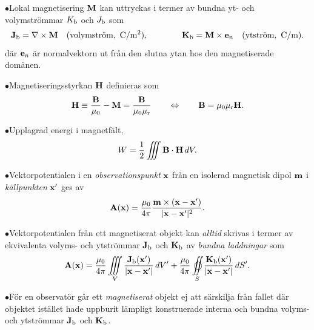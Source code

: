 \item{$\bullet$}{Lokal magnetisering ${\bf M}$ kan uttryckas i termer av
  bundna yt- och volymstr{\"o}mmar $K_{\rm b}$ och $J_{\rm b}$ som
  $$
    {\bf J}_{\rm b}=\nabla\times{\bf M}
                   \quad(\hbox{volymstr{\"o}m},\ {\rm C}/{\rm m}^2),\qquad\qquad
    {\bf K}_{\rm b}={\bf M}\times{\bf e}_n
                   \quad(\hbox{ytstr{\"o}m},\ {\rm C}/{\rm m}).
  $$
  d{\"a}r ${\bf e}_n$ {\"a}r normalvektorn ut fr{\aa}n den slutna ytan hos den
  magnetiserade dom{\"a}nen.}
\item{$\bullet$}{Magnetiseringsstyrkan ${\bf H}$ definieras som
  $$
    {\bf H}\equiv{{\bf B}\over{\mu_0}}-{\bf M}={{\bf B}\over{\mu_0\mu_{\rm r}}}
    \qquad\Leftrightarrow\qquad
    {\bf B}=\mu_0\mu_{\rm r}{\bf H}.
  $$}
\item{$\bullet$}{Upplagrad energi i magnetf{\"a}lt,
  $$
    W = {{1}\over{2}}\iiint{\bf B}\cdot{\bf H}\,dV.
  $$}
\item{$\bullet$}{Vektorpotentialen i en {\it observationspunkt} ${\bf x}$
  fr{\aa}n en isolerad magnetisk dipol ${\bf m}$ i {\it k{\"a}llpunkten}
  ${\bf x}'$ ges av
  $$
    {\bf A}({\bf x})={{\mu_0}\over{4\pi}}
      {{{\bf m}\times({\bf x}-{\bf x}')}\over{|{\bf x}-{\bf x}'|^2}}.
  $$}
\item{$\bullet$}{Vektorpotentialen fr{\aa}n ett magnetiserat objekt kan
  {\it alltid} skrivas i termer av ekvivalenta volyms- och ytstr{\"o}mmar
  ${\bf J}_{\rm b}$ och ${\bf K}_{\rm b}$ av {\it bundna laddningar} som
  $$
    {\bf A}({\bf x}) = {{\mu_0}\over{4\pi}}\iiint_V
      {{{\bf J}_{\rm b}({\bf x}')}\over{|{\bf x}-{\bf x}'|}}\,dV'
    +{{\mu_0}\over{4\pi}}\oiint_S
      {{{\bf K}_{\rm b}({\bf x}')}\over{|{\bf x}-{\bf x}'|}}\,dS'.
  $$}
\item{$\bullet$}{F{\"o}r en observat{\"o}r g{\aa}r ett {\it magnetiserat}
  objekt ej att s{\"a}rskilja fr{\aa}n fallet d{\"a}r objektet ist{\"a}llet
  hade uppburit l{\"a}mpligt konstruerade interna och bundna volyms- och
  ytstr{\"o}mmar ${\bf J}_{\rm b}$ och ${\bf K}_{\rm b}$.}
\index
\bye
